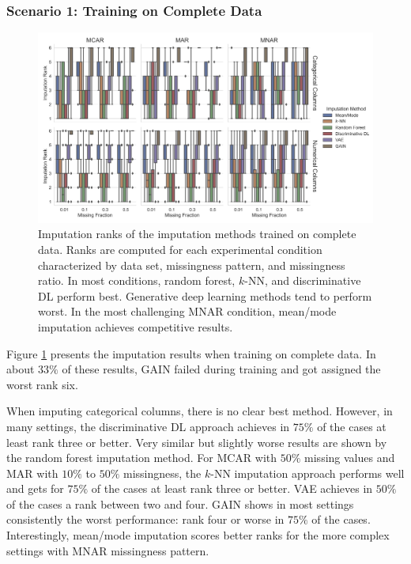 \documentclass[utf8]{frontiersSCNS} %
\begin{document}
\subsubsection{Scenario 1: Training on Complete Data}
\label{sec:results_experiment1_scenario1}

\begin{figure}\centering
	\includegraphics[width=1\columnwidth]{fully_observed_impute_rank_boxplot}
	\caption{Imputation ranks of the  imputation methods trained on complete data. Ranks are computed for each experimental condition characterized by data set, missingness pattern, and missingness ratio. In most conditions, random forest, $k$-NN, and discriminative DL perform best. Generative deep learning methods tend to perform worst. In the most challenging MNAR condition, mean/mode imputation achieves competitive results.
	}
	\label{fig:fully_observed_impute_rank_boxplot}
\end{figure}


Figure \ref{fig:fully_observed_impute_rank_boxplot} presents the imputation results when training on complete data. In about $33\%$ of these results, GAIN failed during training and got assigned the worst rank six.

When imputing categorical columns, there is no clear best method. However, in many settings, the discriminative DL approach achieves in $75\%$ of the cases at least rank three or better. Very similar but slightly worse results are shown by the random forest imputation method. For MCAR with $50\%$ missing values and MAR with $10\%$ to $50\%$ missingness, the $k$-NN imputation approach performs well and gets for $75\%$ of the cases at least rank three or better. VAE achieves in $50\%$ of the cases a rank between two and four. GAIN shows in most settings consistently the worst performance: rank four or worse in $75\%$ of the cases. Interestingly, mean/mode imputation scores better ranks for the more complex settings with MNAR missingness pattern.
\end{document}
